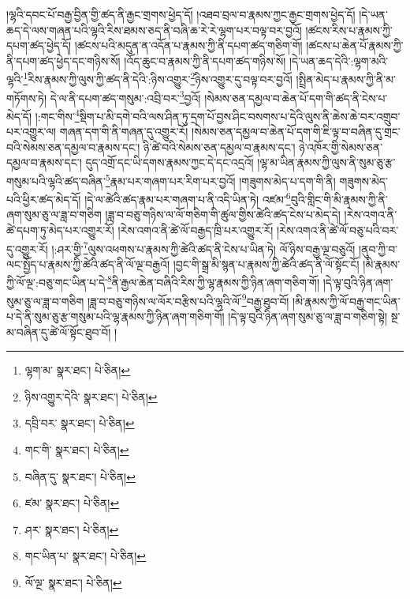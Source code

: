 །ལྷའི་དབང་པོ་བརྒྱ་བྱིན་གྱི་ཚད་ནི་རྒྱང་གྲགས་ཕྱེད་དོ། །འཐབ་བྲལ་བ་རྣམས་ཀྱང་རྒྱང་གྲགས་ཕྱེད་དོ། །དེ་ཡན་ཆད་དེ་ལས་གཞན་པའི་ལྷའི་རིས་ཐམས་ཅད་ནི་བཞི་ཆ་རེ་རེ་ལྷག་པར་བལྟ་བར་བྱའོ། །ཚངས་རིས་པ་རྣམས་ཀྱི་དཔག་ཚད་ཕྱེད་དོ། །ཚངས་པའི་མདུན་ན་འདོན་པ་རྣམས་ཀྱི་ནི་དཔག་ཚད་གཅིག་གོ། །ཚངས་པ་ཆེན་པོ་རྣམས་ཀྱི་ནི་དཔག་ཚད་ཕྱེད་དང་གཉིས་སོ། །འོད་ཆུང་བ་རྣམས་ཀྱི་ནི་དཔག་ཚད་གཉིས་སོ། །དེ་ཡན་ཆད་དེའི་:ལྷག་མའི་ལྷའི་\footnote{ལྷག་མ་  སྣར་ཐང་།  པེ་ཅིན། }རིས་རྣམས་ཀྱི་ལུས་ཀྱི་ཚད་ནི་དེའི་:ཉིས་འགྱུར་\footnote{ཉིས་འགྱུར་དེའི་  སྣར་ཐང་།  པེ་ཅིན། }ཉིས་འགྱུར་དུ་བལྟ་བར་བྱའོ། །སྤྲིན་མེད་པ་རྣམས་ཀྱི་ནི་མ་གཏོགས་ཏེ། དེ་ལ་ནི་དཔག་ཚད་གསུམ་:འབྲི་བར་\footnote{དབྲི་བར་  སྣར་ཐང་།  པེ་ཅིན། }བྱའོ། །སེམས་ཅན་དམྱལ་བ་ཆེན་པོ་དག་གི་ཚད་ནི་ངེས་པ་མེད་དོ། །:གང་གིས་\footnote{གང་གི་  སྣར་ཐང་།  པེ་ཅིན། }སྡིག་པ་མི་དགེ་བའི་ལས་ཤིན་ཏུ་དྲག་པོ་བྱས་ཤིང་བསགས་པ་དེའི་ལུས་ནི་ཆེས་ཆེ་བར་འགྲུབ་པར་འགྱུར་ལ། གཞན་དག་གི་ནི་གཞན་དུ་འགྱུར་རོ། །སེམས་ཅན་དམྱལ་བ་ཆེན་པོ་དག་གི་ཇི་ལྟ་བ་བཞིན་དུ་གྲང་བའི་སེམས་ཅན་དམྱལ་བ་རྣམས་དང་། ཉི་ཚེ་བའི་སེམས་ཅན་དམྱལ་བ་རྣམས་དང་། ཉེ་འཁོར་གྱི་སེམས་ཅན་དམྱལ་བ་རྣམས་དང་། དུད་འགྲོ་དང་ཡི་དགས་རྣམས་ཀྱང་དེ་དང་འདྲའོ། །ལྷ་མ་ཡིན་རྣམས་ཀྱི་ལུས་ནི་སུམ་ཅུ་རྩ་གསུམ་པའི་ལྷའི་ཚད་བཞིན་\footnote{བཞིན་དུ་  སྣར་ཐང་།  པེ་ཅིན། }རྣམ་པར་གཞག་པར་རིག་པར་བྱའོ། །གཟུགས་མེད་པ་དག་གི་ནི། གཟུགས་མེད་པའི་ཕྱིར་ཚད་མེད་དོ། །དེ་ལ་ཚེའི་ཚད་རྣམ་པར་གཞག་པ་ནི་འདི་ཡིན་ཏེ། འཛམ་\footnote{ཛམ་  སྣར་ཐང་།  པེ་ཅིན། }བུའི་གླིང་གི་མི་རྣམས་ཀྱི་ནི་ཞག་སུམ་ཅུ་ལ་ཟླ་བ་གཅིག །ཟླ་བ་བཅུ་གཉིས་ལ་ལོ་གཅིག་གི་ཚུལ་གྱིས་ཚེའི་ཚད་ངེས་པ་མེད་དེ། །རེས་འགའ་ནི་ཚེ་དཔག་ཏུ་མེད་པར་འགྱུར་རོ། །རེས་འགའ་ནི་ཚེ་ལོ་བརྒྱད་ཁྲི་པར་འགྱུར་རོ། །རེས་འགའ་ནི་ཚེ་ལོ་བཅུ་པའི་བར་དུ་འགྱུར་རོ། །:ཤར་གྱི་\footnote{ཤར་  སྣར་ཐང་།  པེ་ཅིན། }ལུས་འཕགས་པ་རྣམས་ཀྱི་ཚེའི་ཚད་ནི་ངེས་པ་ཡིན་ཏེ། ལོ་ཉིས་བརྒྱ་ལྔ་བཅུའོ། །ནུབ་ཀྱི་བ་ལང་སྤྱོད་པ་རྣམས་ཀྱི་ཚེའི་ཚད་ནི་ལོ་ལྔ་བརྒྱའོ། །བྱང་གི་སྒྲ་མི་སྙན་པ་རྣམས་ཀྱི་ཚེའི་ཚད་ནི་ལོ་སྟོང་ངོ། །མི་རྣམས་ཀྱི་ལོ་ལྔ་:བཅུ་གང་ཡིན་པ་དེ་\footnote{གང་ཡིན་པ་  སྣར་ཐང་།  པེ་ཅིན། }ནི་རྒྱལ་ཆེན་བཞིའི་རིས་ཀྱི་ལྷ་རྣམས་ཀྱི་ཉིན་ཞག་གཅིག་གོ། །དེ་ལྟ་བུའི་ཉིན་ཞག་སུམ་ཅུ་ལ་ཟླ་བ་གཅིག །ཟླ་བ་བཅུ་གཉིས་ལ་ལོར་བརྩིས་པའི་ལྷའི་ལོ་\footnote{ལོ་ལྔ་  སྣར་ཐང་།  པེ་ཅིན། }བརྒྱ་ཐུབ་བོ། །མི་རྣམས་ཀྱི་ལོ་བརྒྱ་གང་ཡིན་པ་དེ་ནི་སུམ་ཅུ་རྩ་གསུམ་པའི་ལྷ་རྣམས་ཀྱི་ཉིན་ཞག་གཅིག་གོ། །དེ་ལྟ་བུའི་ཉིན་ཞག་སུམ་ཅུ་ལ་ཟླ་བ་གཅིག་སྟེ། སྔ་མ་བཞིན་དུ་ཚེ་ལོ་སྟོང་ཐུབ་བོ། །
